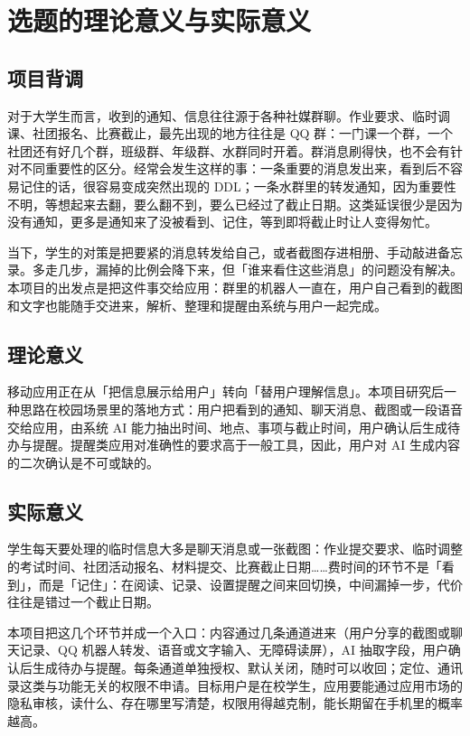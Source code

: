 \documentclass[12pt,a4paper,fontset=windows]{ctexart}
\begin{document}
\newpage
\setcounter{page}{2}

\section{选题的理论意义与实际意义}

\subsection{项目背调}

对于大学生而言，收到的通知、信息往往源于各种社媒群聊。作业要求、临时调课、社团报名、比赛截止，最先出现的地方往往是 QQ 群：一门课一个群，一个社团还有好几个群，班级群、年级群、水群同时开着。群消息刷得快，也不会有针对不同重要性的区分。经常会发生这样的事：一条重要的消息发出来，看到后不容易记住的话，很容易变成突然出现的 DDL；一条水群里的转发通知，因为重要性不明，等想起来去翻，要么翻不到，要么已经过了截止日期。这类延误很少是因为没有通知，更多是通知来了没被看到、记住，等到即将截止时让人变得匆忙。

当下，学生的对策是把要紧的消息转发给自己，或者截图存进相册、手动敲进备忘录。多走几步，漏掉的比例会降下来，但「谁来看住这些消息」的问题没有解决。本项目的出发点是把这件事交给应用：群里的机器人一直在，用户自己看到的截图和文字也能随手交进来，解析、整理和提醒由系统与用户一起完成。

\subsection{理论意义}

移动应用正在从「把信息展示给用户」转向「替用户理解信息」。本项目研究后一种思路在校园场景里的落地方式：用户把看到的通知、聊天消息、截图或一段语音交给应用，由系统 AI 能力抽出时间、地点、事项与截止时间，用户确认后生成待办与提醒。提醒类应用对准确性的要求高于一般工具，因此，用户对 AI 生成内容的二次确认是不可或缺的。

\subsection{实际意义}

学生每天要处理的临时信息大多是聊天消息或一张截图：作业提交要求、临时调整的考试时间、社团活动报名、材料提交、比赛截止日期……费时间的环节不是「看到」，而是「记住」：在阅读、记录、设置提醒之间来回切换，中间漏掉一步，代价往往是错过一个截止日期。

本项目把这几个环节并成一个入口：内容通过几条通道进来（用户分享的截图或聊天记录、QQ 机器人转发、语音或文字输入、无障碍读屏），AI 抽取字段，用户确认后生成待办与提醒。每条通道单独授权、默认关闭，随时可以收回；定位、通讯录这类与功能无关的权限不申请。目标用户是在校学生，应用要能通过应用市场的隐私审核，读什么、存在哪里写清楚，权限用得越克制，能长期留在手机里的概率越高。
\end{document}
